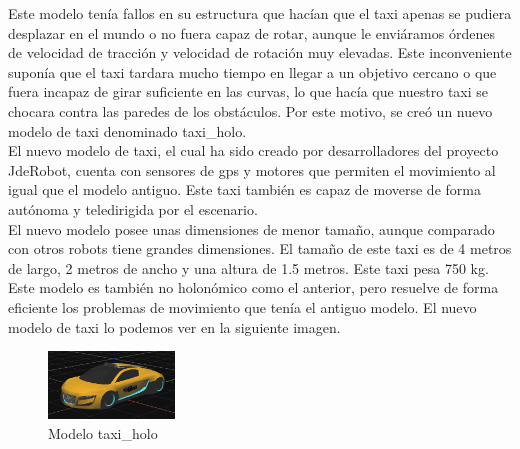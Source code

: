 Este modelo tenía fallos en su estructura que hacían que el taxi apenas se pudiera desplazar en el mundo o no fuera capaz de rotar, aunque le enviáramos órdenes de velocidad de tracción y velocidad de rotación muy elevadas. Este inconveniente suponía que el taxi tardara mucho tiempo en llegar a un objetivo cercano o que fuera incapaz de girar suficiente en las curvas, lo que hacía que nuestro taxi se chocara contra las paredes de los obstáculos. Por este motivo, se creó un nuevo modelo de taxi denominado taxi\_holo.\\

El nuevo modelo de taxi, el cual ha sido creado por desarrolladores del proyecto JdeRobot, cuenta con sensores de \acrshort{gps} y motores que permiten el movimiento al igual que el modelo antiguo. Este taxi también es capaz de moverse de forma autónoma y teledirigida por el escenario.\\

El nuevo modelo posee unas dimensiones de menor tamaño, aunque comparado con otros robots tiene grandes dimensiones. El tamaño de este taxi es de 4 metros de largo, 2 metros de ancho y una altura de 1.5 metros. Este taxi pesa 750 kg. Este modelo es también no holonómico como el anterior, pero resuelve de forma eficiente los problemas de movimiento que tenía el antiguo modelo. El nuevo modelo de taxi lo podemos ver en la siguiente imagen.

\begin{figure}[H]
  \begin{center}
    \includegraphics[width=0.3\textwidth]{figures/GPP/Coche_holo.png}
		\caption{Modelo taxi\_holo}
		\label{fig.coche_holo}
		\end{center}
\end{figure}

